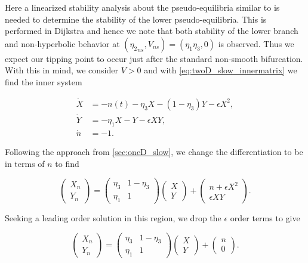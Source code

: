 Here a linearized stability analysis about the pseudo-equilibria similar to \cite{seydel2009practical} is needed to determine the stability of the lower pseudo-equilibria. This is performed in Dijkstra \cite{dijkstra2013nonlinear} and hence we note that both stability of the lower branch and non-hyperbolic behavior at $({\eta_2}_{ns},V_{ns})=(\eta_1\eta_3,0)$ is observed. Thus we expect our tipping point to occur just after the standard non-smooth bifurcation. With this in mind, we consider $V>0$ and with \eqref{eq:twoD_slow_innermatrix} we find the inner system

\begin{equation}\label{eq:twoD_slow_positiveinner}
 \begin{aligned}
   \dot{X} & =  -n(t)-\eta_3 X-(1-\eta_3)Y-\epsilon X^2, \\
   \dot{Y} & =  -\eta_1 X-Y-\epsilon XY,  \\
  \dot{n}  & =  -1.
  \end{aligned}
\end{equation}

Following the approach from \autoref{sec:oneD_slow}, we change the differentiation to be in terms of $n$ to find

\begin{equation*}
\begin{pmatrix}
X_n\\
Y_n
\end{pmatrix}=
\begin{pmatrix}
\eta_3 & 1-\eta_3 \\ 
\eta_1 & 1
\end{pmatrix}
\begin{pmatrix}
X\\
Y
\end{pmatrix} +
\begin{pmatrix}
n+\epsilon X^2\\
\epsilon XY
\end{pmatrix}.
\end{equation*}

Seeking a leading order solution in this region, we drop the $\epsilon$ order terms to give 

\begin{equation}\label{eq:twoD_slow_uppermatrix}
\begin{pmatrix}
X_n\\
Y_n
\end{pmatrix}=
\begin{pmatrix}
\eta_3 & 1-\eta_3 \\ 
\eta_1 & 1
\end{pmatrix}
\begin{pmatrix}
X\\
Y
\end{pmatrix} +
\begin{pmatrix}
n\\
0
\end{pmatrix}.
\end{equation}

